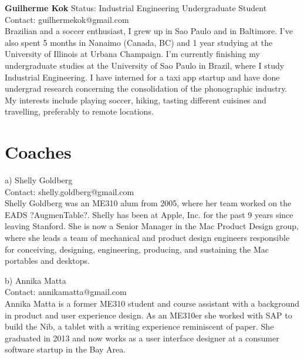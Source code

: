 \textbf{Guilherme Kok}
Status: Industrial Engineering Undergraduate Student \\
Contact: guilhermekok@gmail.com \\
Brazilian and a soccer enthusiast, I grew up in Sao Paulo and in Baltimore. I’ve also spent 5 months in Nanaimo (Canada, BC) and 1 year studying at the University of Illinois at Urbana Champaign. I’m currently finishing my undergraduate studies at the University of Sao Paulo in Brazil, where I study Industrial Engineering. I have interned for a taxi app startup and have done undergrad research concerning the consolidation of the phonographic industry. My interests include playing soccer, hiking, tasting different cuisines and travelling, preferably to remote locations. 

\section{Coaches}
a) Shelly Goldberg \\
Contact: shelly.goldberg@gmail.com \\ 
Shelly Goldberg was an ME310 alum from 2005, where her team worked on the EADS ?AugmenTable?.  Shelly has been at Apple, Inc. for the past 9 years since leaving Stanford.  She is now a Senior Manager in the Mac Product Design group, where she leads a team of mechanical and product design engineers responsible for conceiving, designing, engineering, producing, and sustaining the Mac portables and desktops.  

b) Annika Matta \\
Contact: annikamatta@gmail.com \\
Annika Matta is a former ME310 student and course assistant with a background in product and user experience design. As an ME310er she worked with SAP to build the Nib, a tablet with a writing experience reminiscent of paper. She graduated in 2013 and now works as a user interface designer at a consumer software startup in the Bay Area.
